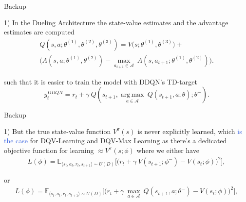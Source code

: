 \documentclass{beamer}
\DeclareMathOperator*{\argmax}{arg\,max}
\begin{document}
\begin{frame}{Backup}

	1) In the Dueling Architecture the state-value estimates and the advantage estimates are computed
	\bigskip
	\begin{multline*}
	Q(s,a;\theta^{(1)},\theta^{(2)},\theta^{(3)}) = V\bigl(s;\theta^{(1)},\theta^{(3)}\bigr) + \\
	\bigl(A(s,a;\theta^{(1)},\theta^{(2)}) - \underset{a_{t+1}\in \mathcal{A}}{\max}\: A(s, a_{t+1};\theta^{(1)},\theta^{(2)}) \bigr).
	\label{eq:dueling}
\end{multline*}
	
	 such that it is easier to train the model with DDQN's TD-target
	\bigskip
	\begin{equation*}
    y^{DDQN}_{t} = r_{t} + \gamma \: Q(s_{t+1}, \underset{a\in \mathcal{A}}{\argmax}\: Q(s_{t+1}, a; \theta); \theta^{-}). 
\end{equation*}

\end{frame}


\begin{frame}{Backup}

	1) But the true state-value function $V^{\pi}(s)$ is never explicitly learned, which \textcolor{RoyalBlue}{is the case} for DQV-Learning and DQV-Max Learning as there's a dedicated objective function for learning $\approx V^{\pi}(s;\phi)$ where we either have
	\bigskip
	\begin{multline*}
			L(\phi) = \mathds{E}_{\langle s_{t},a_{t},r_{t},s_{t+1}\rangle\sim U(D)} \bigg[\big(r_{t} + \gamma \: V(s_{t+1};\phi^{-}) - V(s_{t}; \phi)\big)^{2}\bigg],
		\end{multline*}

	\bigskip
	or
	\begin{multline*}
		L(\phi) = \mathds{E}_{\langle s_{t},a_{t},r_{t},s_{t+1}\rangle\sim U(D)} \bigg[\big(r_{t} + \gamma \: \underset{a\in \mathcal{A}}{\max}\: Q(s_{t+1}, a; \theta^{-}) - V(s_{t}; \phi)\big)^{2}\bigg],
	\end{multline*}

\end{frame}
\end{document}
